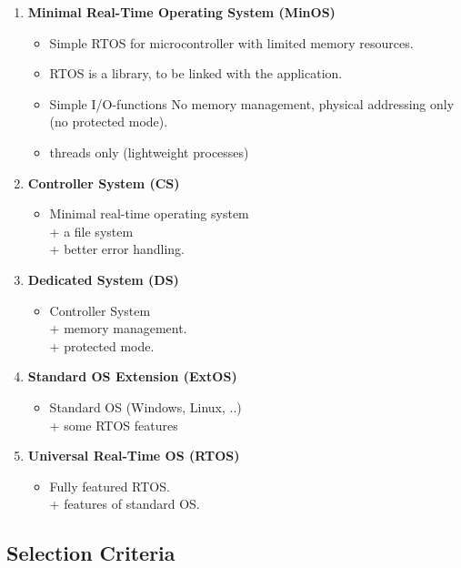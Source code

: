 \begin{enumerate}
\item  \textbf{Minimal Real-Time Operating System (MinOS)} 

\begin{itemize}
	\item Simple RTOS for microcontroller with limited memory resources.
	\item RTOS is a library, to be linked with the application.
	\item Simple I/O-functions No memory management, physical addressing only (no protected mode).
	\item threads only (lightweight processes)
\end{itemize}

\item  \textbf{Controller System (CS)} 

\begin{itemize}
	\item Minimal real-time operating system      \\ + a file system      \\ + better error handling.
\end{itemize}

\item  \textbf{Dedicated System (DS)}   
\begin{itemize}
	\item  Controller System      \\ + memory management.    \\ + protected mode.
\end{itemize}

\item  \textbf{Standard OS Extension (ExtOS)}
\begin{itemize}
	\item  Standard OS (Windows, Linux, ..)  \\ + some RTOS features
\end{itemize} 

\item  \textbf{Universal Real-Time OS (RTOS)} 
\begin{itemize}
	\item  Fully featured RTOS.  \\ + features of standard OS.
\end{itemize} 
\end{enumerate}

\subsection{Selection Criteria}

